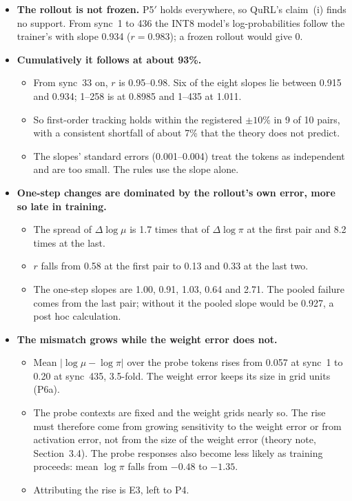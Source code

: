 \documentclass[11pt]{article}
\begin{document}
\begin{itemize}
\item \textbf{The rollout is not frozen.} P5$'$ holds everywhere, so QuRL's claim~(i) finds no support. From sync~1 to 436 the INT8 model's log-probabilities follow the trainer's with slope 0.934 ($r=0.983$); a frozen rollout would give 0.
\item \textbf{Cumulatively it follows at about 93\%.}
  \begin{itemize}
  \item From sync~33 on, $r$ is 0.95--0.98. Six of the eight slopes lie between 0.915 and 0.934; 1--258 is at 0.8985 and 1--435 at 1.011.
  \item So first-order tracking holds within the registered $\pm10\%$ in 9 of 10 pairs, with a consistent shortfall of about 7\% that the theory does not predict.
  \item The slopes' standard errors (0.001--0.004) treat the tokens as independent and are too small. The rules use the slope alone.
  \end{itemize}
\item \textbf{One-step changes are dominated by the rollout's own error, more so late in training.}
  \begin{itemize}
  \item The spread of $\Delta\log\mu$ is 1.7 times that of $\Delta\log\pi$ at the first pair and 8.2 times at the last.
  \item $r$ falls from 0.58 at the first pair to 0.13 and 0.33 at the last two.
  \item The one-step slopes are 1.00, 0.91, 1.03, 0.64 and 2.71. The pooled failure comes from the last pair; without it the pooled slope would be 0.927, a post hoc calculation.
  \end{itemize}
\item \textbf{The mismatch grows while the weight error does not.}
  \begin{itemize}
  \item Mean $|\log\mu-\log\pi|$ over the probe tokens rises from 0.057 at sync~1 to 0.20 at sync~435, 3.5-fold. The weight error keeps its size in grid units (P6a).
  \item The probe contexts are fixed and the weight grids nearly so. The rise must therefore come from growing sensitivity to the weight error or from activation error, not from the size of the weight error (theory note, Section~3.4). The probe responses also become less likely as training proceeds: mean $\log\pi$ falls from $-0.48$ to $-1.35$.
  \item Attributing the rise is E3, left to P4.
  \end{itemize}
\end{itemize}
\end{document}
